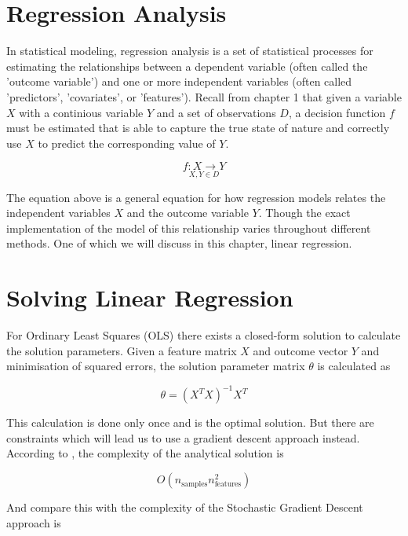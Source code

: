 \section{Regression Analysis}
In statistical modeling, regression analysis is a set of statistical processes 
for estimating the relationships between a dependent variable (often called the 
'outcome variable') and one or more independent variables 
(often called 'predictors', 'covariates', or 'features'). 
\cite{enwiki:regressionanalysis} Recall from chapter 1 that 
given a variable $X$ with a continious variable $Y$ 
and a set of observations $D$, a decision function $f$ must be estimated 
that is able to capture the true state of nature and correctly use $X$ to 
predict the corresponding value of $Y$.  

\begin{equation*}
    \underset{X,Y \in D}{f: X \rightarrow Y}
\end{equation*}

The equation above is a general equation for how regression models relates the
independent variables $X$ and the outcome variable $Y$. Though the exact
implementation of the model of this relationship varies throughout different 
methods. One of which we will discuss in this chapter, linear regression.

\section{Solving Linear Regression}
For Ordinary Least Squares (OLS) there exists a closed-form solution to 
calculate the solution parameters. Given a feature matrix $X$ and outcome vector
$Y$ and minimisation of squared errors, the solution parameter matrix $\theta$ 
is calculated as

\begin{equation*}
    \theta = (X^T X)^{-1}X^T
\end{equation*}

This calculation is done only once and is the optimal solution. But there are 
constraints which will lead us to use a gradient descent approach instead.
According to \cite{scikit-learn}, the complexity of the analytical solution
is 

\begin{equation*}
    O(n_{\text{samples}} n_{\text{features}}^2)
\end{equation*}

And compare this with the complexity of the Stochastic Gradient Descent approach
is 

